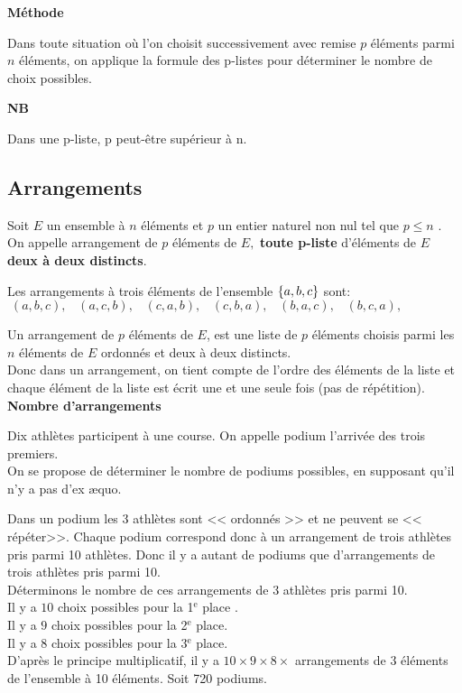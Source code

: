 \bigskip


\textbf{Méthode}

Dans toute situation où  l'on choisit successivement avec remise $ p $ éléments parmi $ n $ éléments, on applique la formule des  p-listes   pour déterminer le nombre de choix possibles.


\medskip
\textbf{NB}

Dans une p-liste, p peut-être supérieur à n.
\subsection{Arrangements}
\begin{definition}
Soit $ E $ un ensemble à $ n $ éléments et $ p $ un entier naturel non nul tel que $p\leq n  $ .\\
On appelle  arrangement  de $ p  $ éléments  de $ E,$   \textbf{toute  p-liste}  d'éléments de $ E $ \textbf{deux à deux distincts}.
\end{definition}
\begin{example}
 Les arrangements à trois éléments de l'ensemble $ \left\{a, b,c\right\} $ sont: $\; (a,b,c),\;\;\; (a,c,b),\;\;\;(c,a,b),\;\;\; (c,b,a),\;\;\; (b,a,c),\;\;\; (b,c,a),\;\;$ 

\end{example}
Un arrangement de $ p $ éléments de $ E $, est une liste  de $ p $ éléments choisis parmi les $ n $ éléments de $ E $ ordonnés et deux à deux  distincts.\\
Donc dans un arrangement, on tient compte de l'ordre des éléments de la liste et chaque élément de la liste est  écrit une et une seule fois (pas de répétition).\\
\textbf{Nombre d'arrangements}
 \begin{example}
  Dix athlètes participent à une course. On appelle podium l'arrivée des trois premiers.\\
On se propose de déterminer le nombre  de podiums possibles, en supposant qu'il n'y a pas d'ex æquo.
\medskip

 Dans un  podium les 3 athlètes  sont << ordonnés >> et ne peuvent se << répéter>>. Chaque  podium correspond donc  à un arrangement de trois athlètes pris parmi 10 athlètes.
Donc il y a autant de podiums  que d'arrangements de trois athlètes pris parmi 10.\\
Déterminons le nombre de ces arrangements de $ 3$ athlètes pris parmi 10.\\
Il y a $ 10 $ choix possibles pour  la 1$^{\text{e}} $ place .\\
Il y a $ 9 $ choix possibles  pour la 2$^{\text{e}} $  place.\\
Il y a $ 8 $ choix possibles pour la 3$^{\text{e}} $ place.\\
D'après le principe multiplicatif, il y a $ 10 \times 9 \times 8 \times  $  arrangements de $ 3 $  éléments de l'ensemble à 10 éléments.  Soit  720 podiums.

 \end{example}

